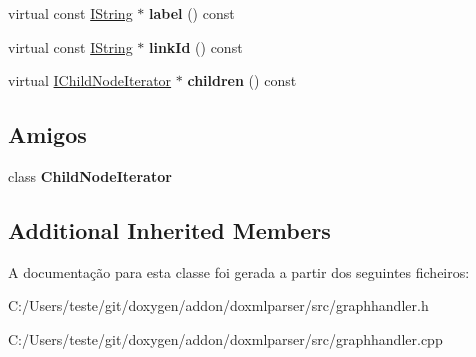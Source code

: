 \begin{DoxyCompactItemize}
\item 
\hypertarget{class_node_handler_a697b0f76328ea9fba4738c74a07cb8c7}{virtual const \hyperlink{class_i_string}{I\-String} $\ast$ {\bfseries label} () const }\label{class_node_handler_a697b0f76328ea9fba4738c74a07cb8c7}

\item 
\hypertarget{class_node_handler_a06fe1b45860c3fa9ea8a94c7ba4357ff}{virtual const \hyperlink{class_i_string}{I\-String} $\ast$ {\bfseries link\-Id} () const }\label{class_node_handler_a06fe1b45860c3fa9ea8a94c7ba4357ff}

\item 
\hypertarget{class_node_handler_ae6cfbc5c0523bc9bf8902cf95b45f8ec}{virtual \hyperlink{class_i_child_node_iterator}{I\-Child\-Node\-Iterator} $\ast$ {\bfseries children} () const }\label{class_node_handler_ae6cfbc5c0523bc9bf8902cf95b45f8ec}

\end{DoxyCompactItemize}
\subsection*{Amigos}
\begin{DoxyCompactItemize}
\item 
\hypertarget{class_node_handler_a667d8ca5ea4d4cddbf115f89fb093c21}{class {\bfseries Child\-Node\-Iterator}}\label{class_node_handler_a667d8ca5ea4d4cddbf115f89fb093c21}

\end{DoxyCompactItemize}
\subsection*{Additional Inherited Members}


A documentação para esta classe foi gerada a partir dos seguintes ficheiros\-:\begin{DoxyCompactItemize}
\item 
C\-:/\-Users/teste/git/doxygen/addon/doxmlparser/src/graphhandler.\-h\item 
C\-:/\-Users/teste/git/doxygen/addon/doxmlparser/src/graphhandler.\-cpp\end{DoxyCompactItemize}
